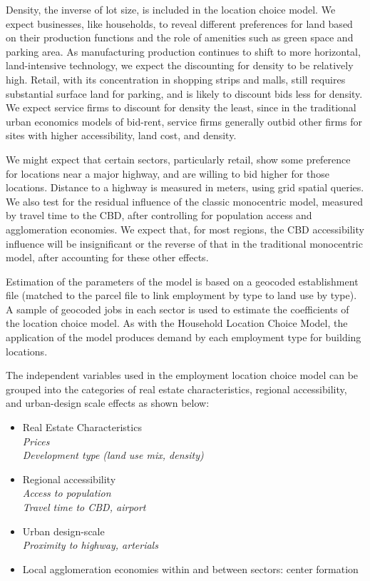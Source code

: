 Density, the inverse of lot size, is included in the location
choice model.  We expect businesses, like households, to reveal
different preferences for land based on their production functions
and the role of amenities such as green space and parking area. As
manufacturing production continues to shift to more horizontal,
land-intensive technology, we expect the discounting for density
to be relatively high.  Retail, with its concentration in shopping
strips and malls, still requires substantial surface land for
parking, and is likely to discount bids less for density.  We
expect service firms to discount for density the least, since in
the traditional urban economics models of bid-rent, service firms
generally outbid other firms for sites with higher accessibility,
land cost, and density.

We might expect that certain sectors, particularly retail, show
some preference for locations near a major highway, and are
willing to bid higher for those locations.  Distance to a highway
is measured in meters, using grid spatial queries.  We also test
for the residual influence of the classic monocentric model,
measured by travel time to the CBD, after controlling for
population access and agglomeration economies.  We expect that,
for most regions, the CBD accessibility influence will be
insignificant or the reverse of that in the traditional
monocentric model, after accounting for these other effects.

Estimation of the parameters of the model is based on a geocoded establishment file
(matched to the parcel file to link employment by type to land use
by type).  A sample of geocoded jobs in each sector is used to
estimate the coefficients of the location choice model.  As with
the Household Location Choice Model, the application of the model
produces demand by each employment type for building locations.

The independent variables used in the employment location choice
model can be grouped into the categories of real estate
characteristics, regional accessibility, and urban-design scale
effects as shown below:

\begin{itemize}

\item Real Estate Characteristics \\ \emph{Prices} \\
\emph{Development type (land use mix, density)}

\item Regional accessibility \\
\emph{Access to population} \\ \emph{Travel time to CBD, airport}

\item Urban design-scale \\ \emph{Proximity to highway, arterials}

\item Local agglomeration economies within and between sectors: center
formation

\end{itemize}



